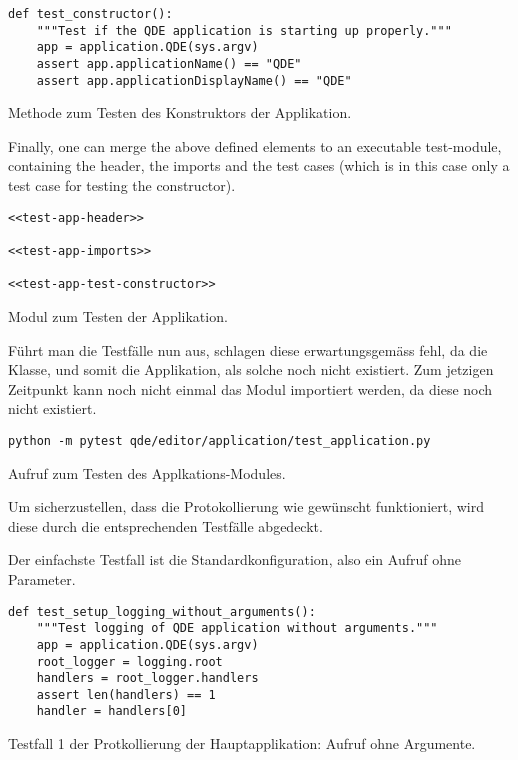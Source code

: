 \documentclass[10pt, openright, notitlepage]{scrreprt}
\begin{document}
\begin{listing}[H]
\begin{verbatim}
def test_constructor():
    """Test if the QDE application is starting up properly."""
    app = application.QDE(sys.argv)
    assert app.applicationName() == "QDE"
    assert app.applicationDisplayName() == "QDE"
\end{verbatim}
\caption{\label{orgded7cc3}
Methode zum Testen des Konstruktors der Applikation.}
\end{listing}

Finally, one can merge the above defined elements to an executable test-module,
containing the header, the imports and the test cases (which is in this case
only a test case for testing the constructor).

\begin{listing}[H]
\begin{verbatim}
<<test-app-header>>

<<test-app-imports>>

<<test-app-test-constructor>>
\end{verbatim}
\caption{Modul zum Testen der Applikation.}
\end{listing}

Führt man die Testfälle nun aus, schlagen diese erwartungsgemäss fehl, da die
Klasse, und somit die Applikation, als solche noch nicht existiert. Zum jetzigen
Zeitpunkt kann noch nicht einmal das Modul importiert werden, da diese noch
nicht existiert.

\begin{listing}[H]
\begin{verbatim}
python -m pytest qde/editor/application/test_application.py
\end{verbatim}
\caption{Aufruf zum Testen des Applkations-Modules.}
\end{listing}

Um sicherzustellen, dass die Protokollierung wie gewünscht funktioniert, wird
diese durch die entsprechenden Testfälle abgedeckt.

Der einfachste Testfall ist die Standardkonfiguration, also ein Aufruf ohne
Parameter.

\begin{listing}[H]
\begin{verbatim}
def test_setup_logging_without_arguments():
    """Test logging of QDE application without arguments."""
    app = application.QDE(sys.argv)
    root_logger = logging.root
    handlers = root_logger.handlers
    assert len(handlers) == 1
    handler = handlers[0]
\end{verbatim}
\caption{\label{org7077535}
Testfall 1 der Protkollierung der Hauptapplikation: Aufruf ohne Argumente.}
\end{listing}
\end{document}
